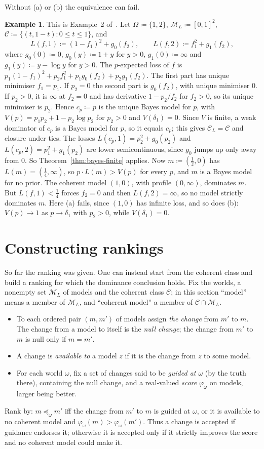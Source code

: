 \documentclass[11pt]{article}
\theoremstyle{definition}
\newtheorem{example}[theorem]{Example}
\theoremstyle{remark}
\newcommand{\M}{\mathcal M}
\newcommand{\C}{\mathcal C}
\begin{document}
Without (a) or (b) the equivalence can fail.
\begin{example}\label{ex:ssk-sharp}
This is Example~2 of~\cite{SSK09}. Let $\Omega\coloneqq\{1,2\}$, $\M_L\coloneqq[0,1]^2$, $\C\coloneqq\{(t,1-t):0\le t\le1\}$, and
\[
L(f,1)\coloneqq(1-f_1)^2+g_0(f_2),\qquad L(f,2)\coloneqq f_1^2+g_1(f_2),
\]
where $g_0(0)\coloneqq0$, $g_0(y)\coloneqq1+y$ for $y>0$, $g_1(0)\coloneqq\infty$ and $g_1(y)\coloneqq y-\log y$ for $y>0$. The $p$-expected loss of $f$ is $p_1(1-f_1)^2+p_2f_1^2+p_1g_0(f_2)+p_2g_1(f_2)$. The first part has unique minimiser $f_1=p_1$. If $p_2=0$ the second part is $g_0(f_2)$, with unique minimiser $0$. If $p_2>0$, it is $\infty$ at $f_2=0$ and has derivative $1-p_2/f_2$ for $f_2>0$, so its unique minimiser is $p_2$. Hence $c_p\coloneqq p$ is the unique Bayes model for $p$, with $V(p)=p_1p_2+1-p_2\log p_2$ for $p_2>0$ and $V(\delta_1)=0$. Since $V$ is finite, a weak dominator of $c_p$ is a Bayes model for $p$, so it equals $c_p$; this gives $\C_L=\C$ and closure under ties. The losses $L(c_p,1)=p_2^2+g_0(p_2)$ and $L(c_p,2)=p_1^2+g_1(p_2)$ are lower semicontinuous, since $g_0$ jumps up only away from $0$. So Theorem~\ref{thm:bayes-finite} applies. Now $m\coloneqq(\frac12,0)$ has $L(m)=(\frac14,\infty)$, so $p\cdot L(m)>V(p)$ for every $p$, and $m$ is a Bayes model for no prior. The coherent model $(1,0)$, with profile $(0,\infty)$, dominates $m$. But $L(f,1)<\frac14$ forces $f_2=0$ and then $L(f,2)=\infty$, so no model strictly dominates $m$. Here (a) fails, since $(1,0)$ has infinite loss, and so does (b): $V(p)\to1$ as $p\to\delta_1$ with $p_2>0$, while $V(\delta_1)=0$.
\end{example}

\section{Constructing rankings}\label{sec:construct}
So far the ranking was given. One can instead start from the coherent class and build a ranking for which the dominance conclusion holds. Fix the worlds, a nonempty set $\M_L$ of models and the coherent class $\C$; in this section ``model'' means a member of $\M_L$, and ``coherent model'' a member of $\C\cap\M_L$.
\begin{itemize}[leftmargin=*]
\item To each ordered pair $(m,m')$ of models assign \emph{the change} from $m'$ to $m$. The change from a model to itself is the \emph{null change}; the change from $m'$ to $m$ is null only if $m=m'$.
\item A change is \emph{available to} a model $z$ if it is the change from $z$ to some model.
\item For each world $\omega$, fix a set of changes said to be \emph{guided at $\omega$} (by the truth there), containing the null change, and a real-valued \emph{score} $\varphi_\omega$ on models, larger being better.
\end{itemize}
Rank by: $m\preceq_\omega m'$ iff the change from $m'$ to $m$ is guided at $\omega$, or it is available to no coherent model and $\varphi_\omega(m)>\varphi_\omega(m')$. Thus a change is accepted if guidance endorses it; otherwise it is accepted only if it strictly improves the score and no coherent model could make it.
\end{document}
